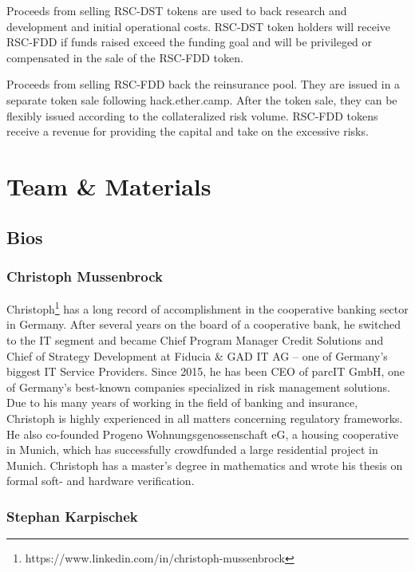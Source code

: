 \documentclass[12pt]{article}
\begin{document}
Proceeds from selling RSC-DST tokens are used to back research and development and initial operational costs. RSC-DST token holders will receive RSC-FDD if funds raised exceed the funding goal and will be privileged or compensated in the sale of the RSC-FDD token.


Proceeds from selling RSC-FDD back the reinsurance pool. They are issued in a separate token sale following hack.ether.camp. After the token sale, they can be flexibly issued according to the collateralized risk volume. RSC-FDD tokens receive a revenue for providing the capital and take on the excessive risks.


\section{Team \& Materials}

\subsection{Bios}

\subsubsection{Christoph Mussenbrock}

Christoph\footnote{https://www.linkedin.com/in/christoph-mussenbrock} has a long record of accomplishment in the cooperative banking sector in Germany. After several years on the board of a cooperative bank, he switched to the IT segment and became Chief Program Manager Credit Solutions and Chief of Strategy Development at Fiducia & GAD IT AG – one of Germany’s biggest IT Service Providers. Since 2015, he has been CEO of parcIT GmbH, one of Germany’s best-known companies specialized in risk management solutions. Due to his many years of working in the field of banking and insurance, Christoph is highly experienced in all matters concerning regulatory frameworks. He also co-founded Progeno Wohnungsgenossenschaft eG, a housing cooperative in Munich, which has successfully crowdfunded a large residential project in Munich. Christoph has a master’s degree in mathematics and wrote his thesis on formal soft- and hardware verification.

\subsubsection{Stephan Karpischek}
\end{document}
